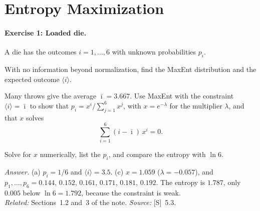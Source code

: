 \documentclass[11pt]{article}      %
\numberwithin{equation}{section}   %
\begin{document}
\section{Entropy Maximization}

\paragraph{Exercise 1: Loaded die.}
A die has the outcomes $i = 1, \dots, 6$ with unknown probabilities $p_i$.
\begin{parts}
    \item With no information beyond normalization, find the MaxEnt distribution and the expected outcome $\langle i\rangle$.
    \item Many throws give the average $\bar\imath = 3.667$. Use MaxEnt with the constraint $\langle i\rangle = \bar\imath$ to show that $p_i = x^i/\sum_{j=1}^6 x^j$, with $x = e^{-\lambda}$ for the multiplier $\lambda$, and that $x$ solves
    \begin{equation*}
        \sum_{i=1}^6 (i - \bar\imath)\,x^i = 0.
    \end{equation*}
    \item Solve for $x$ numerically, list the $p_i$, and compare the entropy with $\ln 6$.
\end{parts}
\textit{Answer.} (a) $p_i = 1/6$ and $\langle i\rangle = 3.5$. (c) $x = 1.059$ ($\lambda = -0.057$), and $p_1, \dots, p_6 = 0.144$, $0.152$, $0.161$, $0.171$, $0.181$, $0.192$. The entropy is $1.787$, only $0.005$ below $\ln 6 = 1.792$, because the constraint is weak.\\
\textit{Related:} Sections~1.2 and~3 of the note. \textit{Source:} [S]~5.3.
\end{document}
